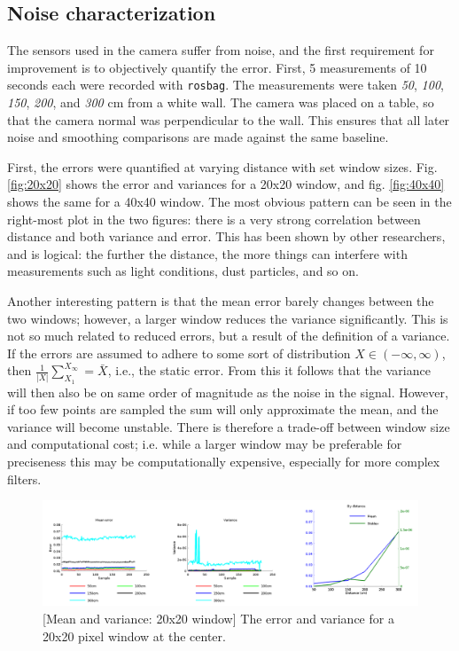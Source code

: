 \documentclass[11pt]{article}
\begin{document}


\subsection{Noise characterization}

The sensors used in the camera suffer from noise, and the first requirement for
improvement is to objectively quantify the error. First, 5 measurements of 10
seconds each were recorded with \texttt{rosbag}. The measurements were taken
\emph{50}, \emph{100}, \emph{150}, \emph{200}, and \emph{300} cm from a white
wall. The camera was placed on a table, so that the camera normal was
perpendicular to the wall. This ensures that all later noise and smoothing
comparisons are made against the same baseline. \par

First, the errors were quantified at varying distance with set window
sizes. Fig. \vref{fig:20x20} shows the error and variances for a 20x20 window,
and fig. \vref{fig:40x40} shows the same for a 40x40 window. The most obvious
pattern can be seen in the right-most plot in the two figures: there is a very
strong correlation between distance and both variance and error. This has been
shown by other researchers, and is logical: the further the distance, the more
things can interfere with measurements such as light conditions, dust particles,
and so on. \par

Another interesting pattern is that the mean error barely changes between the
two windows; however, a larger window reduces the variance significantly. This
is not so much related to reduced errors, but a result of the definition of a
variance. If the errors are assumed to adhere to some sort of distribution
$X \in \left(-\infty, \infty \right)$, then $\frac{1}{\left|X\right|}\sum_{X_1}^{X_\infty} = \bar{X}$,
i.e., the static error. From this it follows that the variance will then also be
on same order of magnitude as the noise in the signal. However, if too few
points are sampled the sum will only approximate the mean, and the variance will
become unstable. There is therefore a trade-off between window size and
computational cost; i.e. while a larger window may be preferable for preciseness
this may be computationally expensive, especially for more complex filters. \par

\begin{figure}[ht]
  \includegraphics[width=1\textwidth]{figures/20x20-plot.png}
  [Mean and variance: 20x20 window]{\label{fig:20x20} The
    error and variance for a 20x20 pixel window at the center.}
\end{figure}
\end{document}
